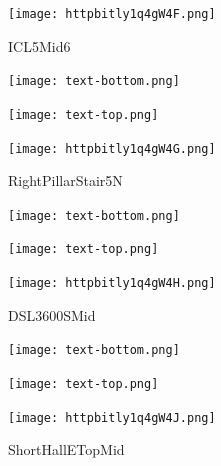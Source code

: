 \documentclass[letterpaper]{article}
\begin{document}
 \begingroup 
 \centerline{\texttt{[image: httpbitly1q4gW4F.png]}} 
 \endgroup 
 \vspace*{\fill} 

 \hfill{\small ICL5Mid6} 

  \vspace{0.7in} 
 
 \centerline{\texttt{[image: text-bottom.png]}} 
 
 \pagebreak 
{} 
 \vspace*{\fill} 
 
  \centerline{\texttt{[image: text-top.png]}} 
 
 \vspace{0.5in} 
 
 \begingroup 
 \centerline{\texttt{[image: httpbitly1q4gW4G.png]}} 
 \endgroup 
 \vspace*{\fill} 

 \hfill{\small RightPillarStair5N} 

  \vspace{0.7in} 
 
 \centerline{\texttt{[image: text-bottom.png]}} 
 
 \pagebreak 
{} 
 \vspace*{\fill} 
 
  \centerline{\texttt{[image: text-top.png]}} 
 
 \vspace{0.5in} 
 
 \begingroup 
 \centerline{\texttt{[image: httpbitly1q4gW4H.png]}} 
 \endgroup 
 \vspace*{\fill} 

 \hfill{\small DSL3600SMid} 

  \vspace{0.7in} 
 
 \centerline{\texttt{[image: text-bottom.png]}} 
 
 \pagebreak 
{} 
 \vspace*{\fill} 
 
  \centerline{\texttt{[image: text-top.png]}} 
 
 \vspace{0.5in} 
 
 \begingroup 
 \centerline{\texttt{[image: httpbitly1q4gW4J.png]}} 
 \endgroup 
 \vspace*{\fill} 

 \hfill{\small ShortHallETopMid} 

  \vspace{0.7in} 
 
\end{document}
